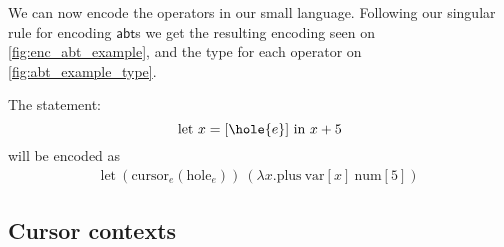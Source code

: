 \documentclass[sigplan,review]{acmart}
\newcommand{\abt}{\textsf{abt}\xspace}
\begin{document}
\begin{example}\label{ex:enc_abt_example}
    We can now encode the operators in our small language. Following
    our singular rule for encoding $\abt$s we get the resulting encoding
    seen on \cref{fig:enc_abt_example}, and the type for each operator
    on \cref{fig:abt_example_type}.



\end{example}
%
The statement:
\begin{equation*}
        \text{let $x=[\hole{e}]$ in $x+5$}
    \end{equation*}
will be encoded as
    \begin{align*}
        \text{let} \ (\text{cursor}_e(\text{hole}_e)) \ (\lambda x . \text{plus} \ \text{var}[x] \ \text{num}[5])
  \end{align*}




\subsection{Cursor contexts}\label{sec:enc_cursor_contexts}
\end{document}

